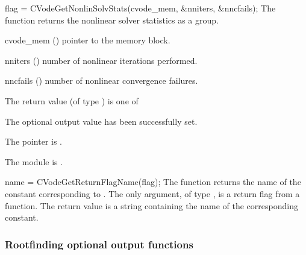 {
  flag = CVodeGetNonlinSolvStats(cvode\_mem, \&nniters, \&nncfails);
}
{
  The function  returns the
  {\cvodes} nonlinear solver statistics as a group.
}
{
  \begin{args}
  \item[cvode\_mem] ()
    pointer to the {\cvodes} memory block.
  \item[nniters] ()
    number of nonlinear iterations performed.
  \item[nncfails] ()
    number of nonlinear convergence failures.
  \end{args}
}
{
  The return value  (of type ) is one of
  \begin{args}
  \item[\Id{CV\_SUCCESS}]
    The optional output value has been successfully set.
  \item[\Id{CV\_MEM\_NULL}]
    The  pointer is .
  \item[\Id{CV\_MEM\_FAIL}]
    The {\sunnonlinsol} module is .
  \end{args}
}
{}
{
  name = CVodeGetReturnFlagName(flag);
}
{
  The function  returns the
  name of the {\cvodes} constant corresponding to .
}
{
  The only argument, of type , is a return flag from a {\cvodes} function.
}
{
  The return value is a string containing the name of the corresponding constant.
}
{}


\subsubsection{Rootfinding optional output functions}\label{sss:optout_root}

